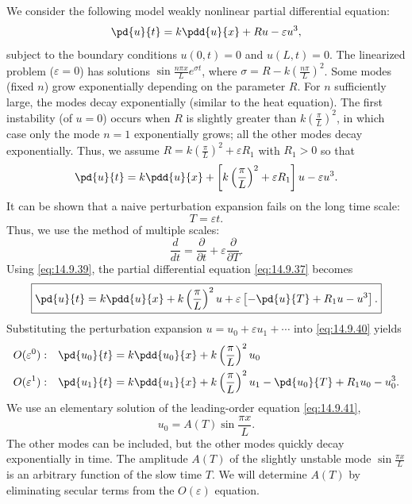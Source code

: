 We consider the following model weakly nonlinear partial differential equation:
\begin{equation}
\pd{u}{t} = k\pdd{u}{x} + Ru - \varepsilon u^3,
\label{eq:14.9.36}
\end{equation}
subject to the boundary conditions $u(0,t) = 0$ and $u(L,t) = 0$. The linearized problem ($\varepsilon = 0$) has solutions $\sin\frac{n\pi x}{L}e^{\sigma t}$, where $\sigma = R - k(\frac{n\pi}{L})^2$. Some modes (fixed $n$) grow exponentially depending on the parameter $R$. For $n$ sufficiently large, the modes decay exponentially (similar to the heat equation). The first instability (of $u = 0$) occurs when $R$ is slightly greater than $k(\frac{\pi}{L})^2$, in which case only the mode $n = 1$ exponentially grows; all the other modes decay exponentially. Thus, we assume $R = k(\frac{\pi}{L})^2 + \varepsilon R_1$ with $R_1 > 0$ so that
\begin{equation}
\pd{u}{t} = k\pdd{u}{x} + \left[k\left(\frac{\pi}{L}\right)^2 + \varepsilon R_1\right]u - \varepsilon u^3.
\label{eq:14.9.37}
\end{equation}
It can be shown that a naive perturbation expansion fails on the long time scale:
\begin{equation}
\boxed{T = \varepsilon t.}
\label{eq:14.9.38}
\end{equation}
Thus, we use the method of multiple scales:
\begin{equation}
\boxed{\frac{d}{d t} = \frac{\partial}{\partial t} + \varepsilon\frac{\partial}{\partial T}.}
\label{eq:14.9.39}
\end{equation}
Using \eqref{eq:14.9.39}, the partial differential equation \eqref{eq:14.9.37} becomes
\begin{equation}
\boxed{\pd{u}{t} = k\pdd{u}{x} + k\left(\frac{\pi}{L}\right)^2 u + \varepsilon\left[-\pd{u}{T} + R_1 u - u^3\right].}
\label{eq:14.9.40}
\end{equation}
Substituting the perturbation expansion $u = u_0 + \varepsilon u_1 + \cdots$ into \eqref{eq:14.9.40} yields
\begin{align}
O(\varepsilon^0): \quad &\pd{u_0}{t} = k\pdd{u_0}{x} + k\left(\frac{\pi}{L}\right)^2 u_0 \label{eq:14.9.41} \\
O(\varepsilon^1): \quad &\pd{u_1}{t} = k\pdd{u_1}{x} + k\left(\frac{\pi}{L}\right)^2 u_1 - \pd{u_0}{T} + R_1 u_0 - u_0^3. \label{eq:14.9.42}
\end{align}
We use an elementary solution of the leading-order equation \eqref{eq:14.9.41},
\begin{equation}
\boxed{u_0 = A(T)\sin\frac{\pi x}{L}.}
\label{eq:14.9.43}
\end{equation}
The other modes can be included, but the other modes quickly decay exponentially in time. The amplitude $A(T)$ of the slightly unstable mode $\sin\frac{\pi x}{L}$ is an arbitrary function of the slow time $T$. We will determine $A(T)$ by eliminating secular terms from the $O(\varepsilon)$ equation.

